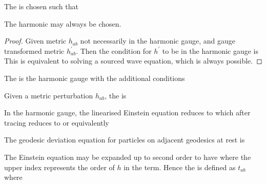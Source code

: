 \documentclass{article}
\begin{document}
\begin{definition}
The  is chosen such that 
\end{definition}

\begin{prop}
The harmonic may always be chosen.
\end{prop}
\begin{proof}
Given metric $h_{ab}$ not necessarily in the harmonic gauge, and gauge transformed metric $h^\prime_{ab}$. Then the condition for $h^\prime$ to be in the harmonic gauge is 
This is equivalent to solving a sourced wave equation, which is always possible. 
\end{proof}

\begin{definition}
The  is the harmonic gauge with the additional conditions 
\end{definition}

\begin{definition}
Given a metric perturbation $h_{ab}$, the  is 
\end{definition}

\begin{lemma}
In the harmonic gauge, the linearised Einstein equation reduces to 
which after tracing reduces to 
or equivalently 
\end{lemma}

\begin{lemma}
The geodesic deviation equation for particles on adjacent geodesics at rest is 
\end{lemma}

\begin{definition}
The Einstein equation may be expanded up to second order to have 
where the upper index represents the order of $h$ in the term. Hence the  is defined as $t_{ab}$ where
\end{definition}
\end{document}
